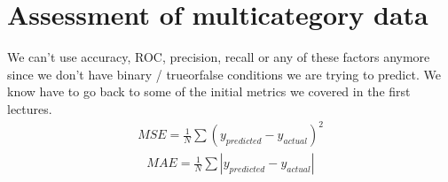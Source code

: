 \documentclass[letterpaper,10pt,english]{sphinxmanual}
\begin{document}
\noindent{}


\chapter{Assessment of multi\sphinxhyphen{}category data}
\label{\detokenize{05-SupervisedSegmentation:assessment-of-multi-category-data}}
\sphinxAtStartPar
We can’t use accuracy, ROC, precision, recall or any of these factors anymore since we don’t have binary / true\sphinxhyphen{}or\sphinxhyphen{}false conditions we are trying to predict. We know have to go back to some of the initial metrics we covered in the first lectures.
\begin{equation*}
\begin{split} MSE = \frac{1}{N}\sum \left(y_{predicted} - y_{actual}\right)^2 \end{split}
\end{equation*}\begin{equation*}
\begin{split} MAE = \frac{1}{N}\sum |y_{predicted} - y_{actual}| \end{split}
\end{equation*}
\end{document}
